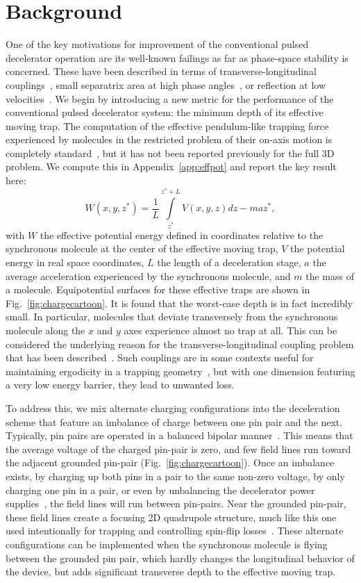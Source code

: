 \documentclass[%
 reprint,
 amsmath,amssymb,
 aps,
pra,
]{revtex4-1}
\begin{document}
\section{Background}
One of the key motivations for improvement of the conventional pulsed decelerator operation are its well-known failings as far as phase-space stability is concerned. These have been described in terms of transverse-longitudinal couplings~\cite{VanDeMeerakker2006}, small separatrix area at high phase angles~\cite{Hudson2004}, or reflection at low velocities~\cite{Sawyer2008a}. We begin by introducing a new metric for the performance of the conventional pulsed decelerator system: the minimum depth of its effective moving trap. The computation of the effective pendulum-like trapping force experienced by molecules in the restricted problem of their on-axis motion is completely standard~\cite{Bethlem2000,Hudson2004}, but it has not been reported previously for the full 3D problem. We compute this in Appendix~\ref{app:effpot} and report the key result here:
\begin{equation}
W(x,y,z^*) =\frac{1}{L}\int\limits_{z^*}^{z^*+L}V(x,y,z) dz - maz^*,
\end{equation}
with $W$ the effective potential energy defined in coordinates relative to the synchronous molecule at the center of the effective moving trap, $V$ the potential energy in real space coordinates, $L$ the length of a deceleration stage, $a$ the average acceleration experienced by the synchronous molecule, and $m$ the mass of a molecule.
Equipotential surfaces for these effective traps are shown in Fig.~\ref{fig:chargecartoon}. It is found that the worst-case depth is in fact incredibly small. In particular, molecules that deviate transversely from the synchronous molecule along the $x$ and $y$ axes experience almost no trap at all. This can be considered the underlying reason for the transverse-longitudinal coupling problem that has been described~\cite{VanDeMeerakker2006}. Such couplings are in some contexts useful for maintaining ergodicity in a trapping geometry~\cite{Surkov1996}, but with one dimension featuring a very low energy barrier, they lead to unwanted loss.

To address this, we mix alternate charging configurations into the deceleration scheme that feature an imbalance of charge between one pin pair and the next. Typically, pin pairs are operated in a balanced bipolar manner~\cite{VanDeMeerakker2012}. This means that the average voltage of the charged pin-pair is zero, and few field lines run toward the adjacent grounded pin-pair (Fig.~\ref{fig:chargecartoon}). Once an imbalance exists, by charging up both pins in a pair to the same non-zero voltage, by only charging one pin in a pair, or even by unbalancing the decelerator power supplies~\cite{Hoekstra2018}, the field lines will run between pin-pairs. Near the grounded pin-pair, these field lines create a focusing 2D quadrupole structure, much like this one used intentionally for trapping and controlling spin-flip losses~\cite{Reens2017}. These alternate configurations can be implemented when the synchronous molecule is flying between the grounded pin pair, which hardly changes the longitudinal behavior of the device, but adds significant transverse depth to the effective moving trap.
\end{document}
